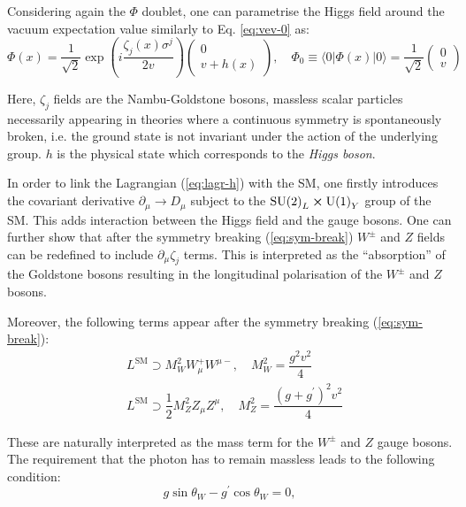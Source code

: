 Considering again the $\Phi$ doublet, one can parametrise the Higgs field around the vacuum expectation value similarly to Eq. \ref{eq:vev-0} as:
\begin{equation}\label{eq:sym-break}
    \Phi(x) = \dfrac{1}{\sqrt{2}}\exp\left(i\dfrac{\zeta_j(x)\sigma^j}{2v}\right)\left(\begin{matrix}0 \\ v + h(x)\end{matrix}\right), \quad \Phi_0 \equiv \langle 0 | \Phi(x) | 0 \rangle = \dfrac{1}{\sqrt{2}}\left(\begin{matrix}0 \\ v \end{matrix}\right)
\end{equation}

Here, $\zeta_j$ fields are the Nambu-Goldstone bosons, massless scalar particles necessarily appearing in theories where a continuous symmetry is spontaneously broken, i.e. the ground state is not invariant under the action of the underlying group. $h$ is the physical state which corresponds to the \textit{Higgs boson}.

In order to link the Lagrangian (\ref{eq:lagr-h}) with the SM, one firstly introduces the covariant derivative $\partial_\mu \to D_\mu$ subject to the $\text{SU(2)}_L \cross \text{U(1)}_Y$ group of the SM. This adds interaction between the Higgs field and the gauge bosons. One can further show that after the symmetry breaking (\ref{eq:sym-break}) $W^\pm$ and $Z$ fields can be redefined to include $\partial_\mu\zeta_j$ terms. This is interpreted as the \enquote{absorption} of the Goldstone bosons resulting in the longitudinal polarisation of the $W^\pm$ and $Z$ bosons.

Moreover, the following terms appear after the symmetry breaking (\ref{eq:sym-break}):
\begin{align}
    &L^\text{SM} \supset M_W^2W_\mu^+ W^{\mu-}, \quad M_W^2 = \dfrac{g^2v^2}{4}\\
    &L^\text{SM} \supset \dfrac{1}{2}M_Z^2 Z_\mu Z^{\mu}, \quad M_Z^2 = \dfrac{(g+g^\prime)^2v^2}{4}
\end{align}

These are naturally interpreted as the mass term for the $W^\pm$ and $Z$ gauge bosons. The requirement that the photon has to remain massless leads to the following condition:
\begin{equation}
    g\sin\theta_W - g^\prime\cos\theta_W = 0,
\end{equation}

